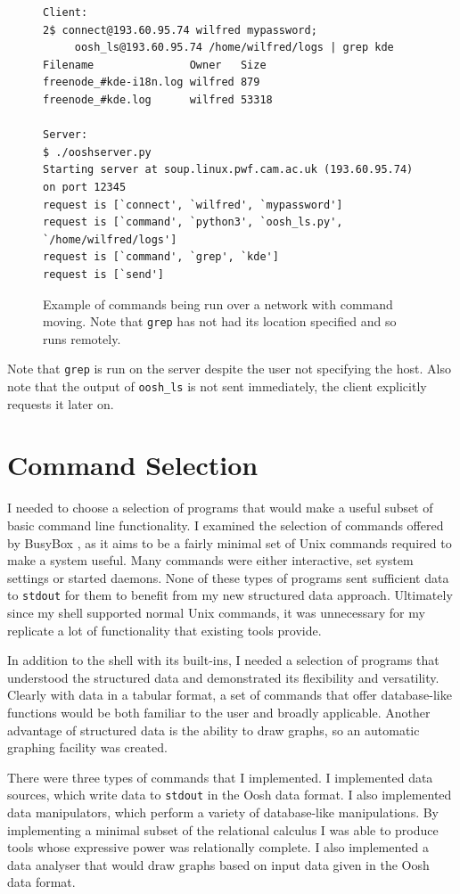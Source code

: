 \documentclass[12pt,twoside,notitlepage]{report}
\begin{document}
\begin{figure}
\begin{verbatim}
Client:
2$ connect@193.60.95.74 wilfred mypassword;
     oosh_ls@193.60.95.74 /home/wilfred/logs | grep kde
Filename               Owner   Size
freenode_#kde-i18n.log wilfred 879
freenode_#kde.log      wilfred 53318

Server:
$ ./ooshserver.py
Starting server at soup.linux.pwf.cam.ac.uk (193.60.95.74) on port 12345
request is [`connect', `wilfred', `mypassword']
request is [`command', `python3', `oosh_ls.py', `/home/wilfred/logs']
request is [`command', `grep', `kde']
request is [`send']
\end{verbatim}
  \caption{Example of commands being run over a network with command
    moving. Note that {\tt grep} has not had its location specified
    and so runs remotely.}
  \label{grepexample}
\end{figure}

Note that {\tt grep} is run on the server despite the user not specifying
the host. Also note that the output of {\tt oosh\_ls} is not sent
immediately, the client explicitly requests it later on.

\section{Command Selection}
I needed to choose a selection of programs that would make a useful
subset of basic command line functionality. I examined the selection
of commands offered by BusyBox \cite{busybox}, as it aims to be a
fairly minimal set of Unix commands required to make a system
useful. Many commands were either interactive, set system settings or
started daemons. None of these types of programs sent sufficient data
to {\tt stdout} for them to benefit from my new structured data
approach. Ultimately since my shell supported normal Unix commands, it
was unnecessary for my replicate a lot of functionality that existing
tools provide.

In addition to the shell with its built-ins, I needed a selection of
programs that understood the structured data and demonstrated its
flexibility and versatility. Clearly with data in a tabular format, a
set of commands that offer database-like functions would be both
familiar to the user and broadly applicable. Another advantage
of structured data is the ability to draw graphs, so an automatic
graphing facility was created.

There were three types of commands that I implemented. I implemented
data sources, which write data to {\tt stdout} in the Oosh data
format. I also implemented data manipulators, which perform a variety
of database-like manipulations. By implementing a minimal subset of
the relational calculus I was able to produce tools whose expressive
power was relationally complete. I also implemented a data analyser
that would draw graphs based on input data given in the Oosh data
format.
\end{document}
